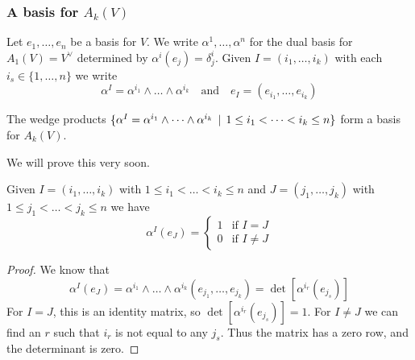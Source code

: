 \begin{frame}
  \frametitle{A basis for $A_k(V)$}
  Let $e_1, \dots, e_n$ be a basis for $V$.
  We write $\alpha^1, \dots, \alpha^n$
  for the dual basis for $A_1(V) = V^\vee$ determined by
  $\alpha^i(e_j) = \delta^i_j$.
  Given $I = (i_1, \dots, i_k)$ with each $i_s \in \{1,\dots, n\}$
  we write 
  \begin{displaymath}
    \alpha^I = \alpha^{i_1} \wedge \dots \wedge \alpha^{i_k}
    \quad \text{and} \quad
    e_I = (e_{i_1}, \dots, e_{i_k})
  \end{displaymath}
  \begin{prop}
    The wedge products
    $\{
    \alpha^I = \alpha^{i_1} \wedge \dots \wedge \alpha^{i_k}
    \, \mid \, 
    1 \le i_1 < \dots < i_k \le n
    \}
    $
    form a basis for $A_k(V)$.
  \end{prop}
  We will prove this very soon.
\end{frame}
\begin{frame}
  \begin{lem}
    Given
    $I = (i_1, \dots, i_k)$ with 
    $
    1 \le i_1 < \dots < i_k \le n
    $
    and 
    $J = (j_1, \dots, j_k)$ with 
    $
    1 \le j_1 < \dots < j_k \le n
    $
    we have
    \begin{displaymath}
      \alpha^I(e_J) = 
      \begin{cases}
        1 & \text{if $I=J$} \\
        0 & \text{if $I\ne J$}
      \end{cases}
    \end{displaymath}
  \end{lem}
  \begin{proof}
    We know that 
    \begin{displaymath}
      \alpha^I(e_J) = \alpha^{i_1} \wedge \dots \wedge \alpha^{i_k}
      (e_{j_1}, \dots, e_{j_k}) = \det [\alpha^{i_r}(e_{j_s})]
    \end{displaymath}
    For $I = J$, this is an identity matrix, so $\det [\alpha^{i_r}(e_{j_s})] =
    1$.
    For $I \ne J$ we can find an $r$ such that $i_r$ is not equal to any $j_s$.
    Thus the matrix has a zero row, and the determinant is zero.
  \end{proof}
\end{frame}

